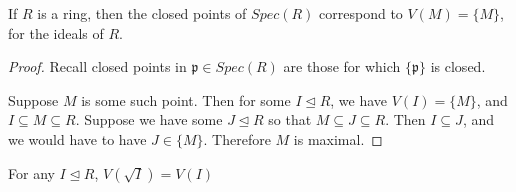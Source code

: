\documentclass{article}
\theoremstyle{plain}%
\newtheorem[L]{thm}{Theorem}[section]
\newtheorem[L]{lem}[thm]{Lemma}
\newtheorem[L]{prop}[thm]{Proposition}
\theoremstyle{definition}
\newtheorem[M]{defn}{Definition}[section]
\newtheorem[M]{exmp}{Example}[section]
\theoremstyle{remark}
\begin{document}
\begin{prop}
    If $R$ is a ring, then the closed points of $Spec(R)$ correspond to $V(M)=\{M\} $, for the ideals of $R$.
\end{prop}
\begin{proof} 
    Recall closed points in $\mathfrak{p}\in Spec(R)$ are those for which $\{\mathfrak{p}\}$ is closed.

    Suppose $M$ is some such point. Then for some $I\trianglelefteq R$, we have $V(I)=\{M\} $, and $I\subseteq M\subseteq R$. Suppose we have some $J\trianglelefteq R$ so that $M\subseteq J\subseteq R$. Then $I\subseteq J$, and we would have to have  $J\in \{M\} $. Therefore $M$ is maximal. 
\end{proof}
\begin{prop}
    For any $I\trianglelefteq R$, $V(\sqrt{I} )=V(I)$
\end{prop}
\end{document}
